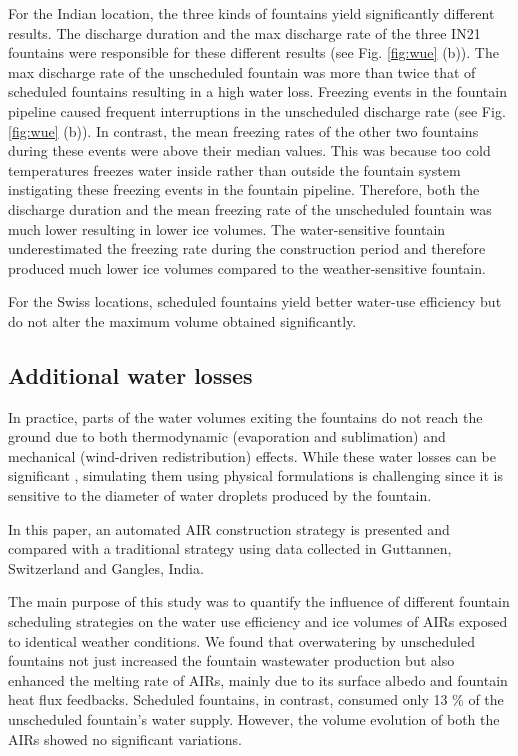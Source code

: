 \documentclass[tc, manuscript]{copernicus}
\begin{document}
For the Indian location, the three kinds of fountains yield significantly different results.  The discharge
duration and the max discharge rate of the three IN21 fountains were responsible for these different results
(see Fig. \ref{fig:wue} (b)). The max discharge rate of the unscheduled fountain was more than twice that of
scheduled fountains resulting in a high water loss. Freezing events in the fountain pipeline caused frequent
interruptions in the unscheduled discharge rate (see Fig. \ref{fig:wue} (b)). In contrast, the mean freezing
rates of the other two fountains during these events were above their median values. This was because too cold
temperatures freezes water inside rather than outside the fountain system instigating these freezing events in
the fountain pipeline. Therefore, both the discharge duration and the mean freezing rate of the unscheduled
fountain was much lower resulting in lower ice volumes. The water-sensitive fountain underestimated the freezing
rate during the construction period and therefore produced much lower ice volumes compared to the
weather-sensitive fountain. 

For the Swiss locations, scheduled fountains yield better water-use efficiency but do not alter the maximum
volume obtained significantly. 


\subsection{Additional water losses}

In practice, parts of the water volumes exiting the fountains do not reach the ground due to both thermodynamic
(evaporation and sublimation) and mechanical (wind-driven redistribution) effects. While these water losses can
be significant \citep{hanzerSimulationSnowManagement2020}, simulating them using physical formulations is
challenging since it is sensitive to the diameter of water droplets produced by the fountain.


\conclusions

In this paper, an automated AIR construction strategy is presented and compared with a traditional strategy
using data collected in Guttannen, Switzerland and Gangles, India.

The main purpose of this study was to quantify the influence of different fountain scheduling strategies on the
water use efficiency and ice volumes of AIRs exposed to identical weather conditions. We found that overwatering by
unscheduled fountains not just increased the fountain wastewater production but also enhanced the melting rate
of AIRs, mainly due to its surface albedo and fountain heat flux feedbacks. Scheduled fountains, in contrast,
consumed only 13 \% of the unscheduled fountain's water supply. However, the volume evolution of both the AIRs
showed no significant variations. 
\end{document}
